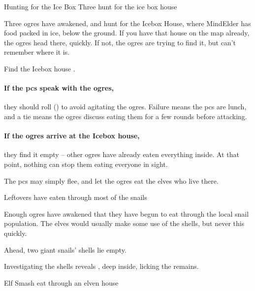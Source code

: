\begin{multicols}{2}
{Hunting for the Ice Box}%
{Three  hunt for the ice box house}%
\label{ogresEatIcebox}

Three \glspl{ogre} have awakened, and hunt for the Icebox House, where \gls{MindElder} has food packed in ice, below the ground.
If you have that house on the map already, the \glspl{ogre} head there, quickly.
If not, the \glspl{ogre} are trying to find it, but can't remember where it is.

Find the Icebox house .


\paragraph{If the \glspl{pc} speak with the \glspl{ogre},}
they should roll  (\tn[10]) to avoid agitating the \glspl{ogre}.
Failure means the \glspl{pc} are lunch, and a tie means the \glspl{ogre} discuss eating them for a few \glspl{round} before attacking.

\paragraph{If the \glspl{ogre} arrive at the Icebox house,}
they find it empty -- other \glspl{ogre} have already eaten everything inside.
At that point, nothing can stop them eating everyone in sight.

The \glspl{pc} may simply flee, and let the \glspl{ogre} eat the elves who live there.

{Leftovers}%
{ have eaten through most of the snails}%

Enough \glspl{ogre} have awakened that they have begun to eat through the local snail population.
The elves would usually make some use of the shells, but never this quickly.

\begin{boxtext}
  Ahead, two giant snails' shells lie empty.
\end{boxtext}

Investigating the shells reveals , deep inside, licking the remains.

\enchantedOgre

\vspace{-3em}
{Elf Smash}%
{ eat through an elven house}%


\end{multicols}

